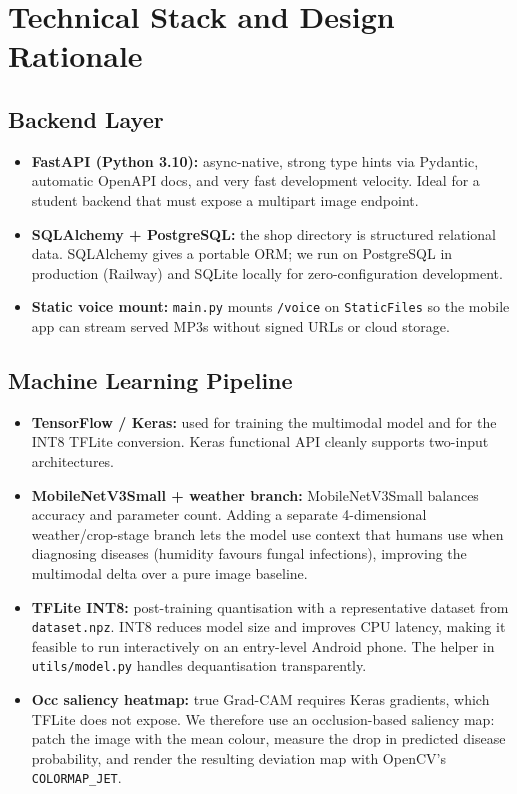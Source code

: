 \documentclass[11pt]{article}
\begin{document}
\section{Technical Stack and Design Rationale}

\subsection{Backend Layer}
\begin{itemize}
    \item \textbf{FastAPI (Python 3.10):} async-native, strong type hints via Pydantic, automatic OpenAPI docs, and very fast development velocity. Ideal for a student backend that must expose a multipart image endpoint.
    \item \textbf{SQLAlchemy + PostgreSQL:} the shop directory is structured relational data. SQLAlchemy gives a portable ORM; we run on PostgreSQL in production (Railway) and SQLite locally for zero-configuration development.
    \item \textbf{Static voice mount:} \texttt{main.py} mounts \texttt{/voice} on \texttt{StaticFiles} so the mobile app can stream served MP3s without signed URLs or cloud storage.
\end{itemize}

\subsection{Machine Learning Pipeline}
\begin{itemize}
    \item \textbf{TensorFlow / Keras:} used for training the multimodal model and for the INT8 TFLite conversion. Keras functional API cleanly supports two-input architectures.
    \item \textbf{MobileNetV3Small + weather branch:} MobileNetV3Small balances accuracy and parameter count. Adding a separate 4-dimensional weather/crop-stage branch lets the model use context that humans use when diagnosing diseases (humidity favours fungal infections), improving the multimodal delta over a pure image baseline.
    \item \textbf{TFLite INT8:} post-training quantisation with a representative dataset from \texttt{dataset.npz}. INT8 reduces model size and improves CPU latency, making it feasible to run interactively on an entry-level Android phone. The helper in \texttt{utils/model.py} handles dequantisation transparently.
    \item \textbf{Occ saliency heatmap:} true Grad-CAM requires Keras gradients, which TFLite does not expose. We therefore use an occlusion-based saliency map: patch the image with the mean colour, measure the drop in predicted disease probability, and render the resulting deviation map with OpenCV's \texttt{COLORMAP\_JET}.
\end{itemize}
\end{document}
